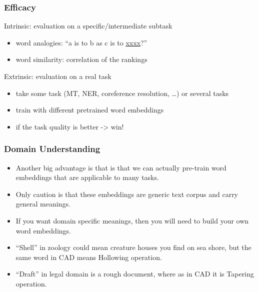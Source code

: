 \begin{frame}[fragile]\frametitle{Efficacy}
Intrinsic: evaluation on a specific/intermediate subtask
\begin{itemize}
\item  word analogies: “a is to b as c is to \underline{xxxx}?” 
\item  word similarity: correlation of the rankings
\end{itemize}
Extrinsic: evaluation on a real task
\begin{itemize}
\item  take some task (MT, NER, coreference resolution, …) or several tasks
\item   train with different pretrained word embeddings
\item  if the task quality is better -> win!
\end{itemize}
\end{frame}

\begin{frame}[fragile]\frametitle{Domain Understanding}
  \begin{itemize}
    \item Another big advantage is that  is that we can actually pre-train word embeddings that are applicable to many tasks. 
	\item Only caution is that these embeddings are generic text corpus and carry general meanings.
	\item If you want domain specific meanings, then you will need to build your own word embeddings.
	\item ``Shell'' in zoology could mean creature houses you find on sea shore, but the same word in CAD means Hollowing operation.
	\item ``Draft'' in legal domain is a rough document, where as in CAD it is Tapering operation.
  \end{itemize}

\end{frame}

